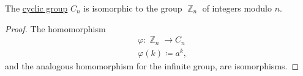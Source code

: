 \begin{proposition}\label{thm:cyclic_group_isomorphic_to_integers_modulo_n}
  The \hyperref[def:cyclic_group]{cyclic group} \( C_n \) is isomorphic to the group \hyperref[thm:group_of_integers_modulo]{\( \BbbZ_n \)} of integers modulo \( n \).
\end{proposition}
\begin{proof}
  The homomorphism
  \begin{equation*}
    \begin{aligned}
      &\varphi: \BbbZ_n \to C_n \\
      &\varphi(k) \coloneqq a^k,
    \end{aligned}
  \end{equation*}
  and the analogous homomorphism for the infinite group, are isomorphisms.
\end{proof}

